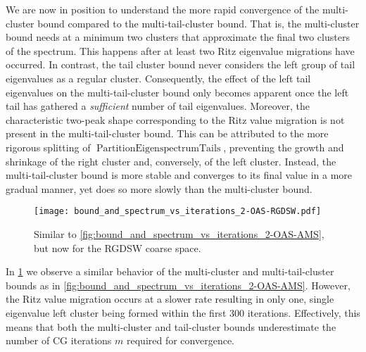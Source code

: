 We are now in position to understand the more rapid convergence of the multi-cluster bound compared to the multi-tail-cluster bound. That is, the multi-cluster bound needs at a minimum two clusters that approximate the final two clusters of the spectrum. This happens after at least two Ritz eigenvalue migrations have occurred. In contrast, the tail cluster bound never considers the left group of tail eigenvalues as a regular cluster. Consequently, the effect of the left tail eigenvalues on the multi-tail-cluster bound only becomes apparent once the left tail has gathered a \textit{sufficient} number of tail eigenvalues. Moreover, the characteristic two-peak shape corresponding to the Ritz value migration is not present in the multi-tail-cluster bound. This can be attributed to the more rigorous splitting of $\operatorname{PartitionEigenspectrumTails}$, preventing the growth and shrinkage of the right cluster and, conversely, of the left cluster. Instead, the multi-tail-cluster bound is more stable and converges to its final value in a more gradual manner, yet does so more slowly than the multi-cluster bound.
\begin{figure}[H]
    \centering
    \texttt{[image: bound\_and\_spectrum\_vs\_iterations\_2-OAS-RGDSW.pdf]}
    \caption{Similar to \cref{fig:bound_and_spectrum_vs_iterations_2-OAS-AMS}, but now for the RGDSW coarse space.}
    \label{fig:bound_and_spectrum_vs_iterations_2-OAS-RGDSW}
\end{figure}
In \cref{fig:bound_and_spectrum_vs_iterations_2-OAS-RGDSW} we observe a similar behavior of the multi-cluster and multi-tail-cluster bounds as in \cref{fig:bound_and_spectrum_vs_iterations_2-OAS-AMS}. However, the Ritz value migration occurs at a slower rate resulting in only one, single eigenvalue left cluster being formed within the first 300 iterations. Effectively, this means that both the multi-cluster and tail-cluster bounds underestimate the number of CG iterations $m$ required for convergence.

